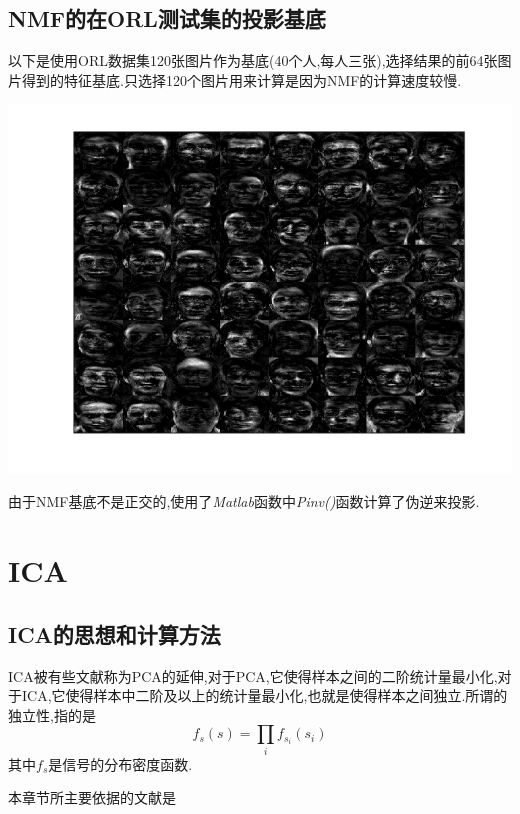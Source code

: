 \subsection{NMF的在ORL测试集的投影基底}
以下是使用ORL数据集120张图片作为基底(40个人,每人三张),选择结果的前64张图片得到的特征基底.只选择120个图片用来计算是因为NMF的计算速度较慢.
\begin{center}
\begin{minipage}[t]{\linewidth}
\center
{
\includegraphics[width=\textwidth]{Img/nmf_base.png} 
}
\end{minipage}
\medskip
\end{center}


由于NMF基底不是正交的,使用了\textit{Matlab}函数中\textit{Pinv()}函数计算了伪逆来投影.
\section{ICA}
\subsection{ICA的思想和计算方法}
ICA被有些文献称为PCA的延伸,对于PCA,它使得样本之间的二阶统计量最小化,对于ICA,它使得样本中二阶及以上的统计量最小化,也就是使得样本之间独立.所谓的独立性,指的是 \begin{equation}
		f_s(s) = \prod_i f_{s_i}(s_i)
	\end{equation}
	其中$f_s$是信号的分布密度函数.

本章节所主要依据的文献是\cite{icafordummies, draper2003recognizing, vaseghi2006principal, langlois2010introduction, hyvarinen2000independent, awasthyanalysis, khaparde2008fastica}\newline

